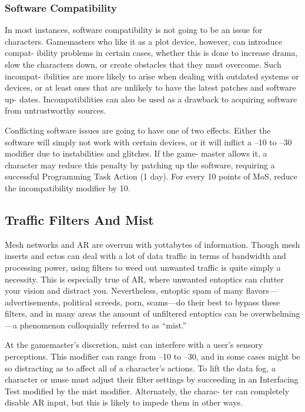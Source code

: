 \subsubsection{Software Compatibility}

In most instances, software compatibility is not going 
to be an issue for characters. Gamemasters who like 
it as a plot device, however, can introduce compat-
ibility problems in certain cases, whether this is done 
to increase drama, slow the characters down, or create 
obstacles that they must overcome. Such incompat-
ibilities are more likely to arise when dealing with 
outdated systems or devices, or at least ones that are 
unlikely to have the latest patches and software up-
dates. Incompatibilities can also be used as a drawback 
to acquiring software from untrustworthy sources.

Conflicting software issues are going to have one of 
two effects. Either the software will simply not work 
with certain devices, or it will inflict a –10 to –30 
modifier due to instabilities and glitches. If the game-
master allows it, a character may reduce this penalty 
by patching up the software, requiring a successful 
Programming Task Action (1 day). For every 10 points 
of MoS, reduce the incompatibility modifier by 10.

\subsection{Traffic Filters And Mist}

Mesh networks and AR are overrun with yottabytes of 
information. Though mesh inserts and ectos can deal 
with a lot of data traffic in terms of bandwidth and 
processing power, using filters to weed out unwanted 
traffic is quite simply a necessity. This is especially true 
of AR, where unwanted entoptics can clutter your 
vision and distract you. Nevertheless, entoptic spam of 
many flavors—advertisements, political screeds, porn, 
scams—do their best to bypass these filters, and in 
many areas the amount of unfiltered entoptics can be 
overwhelming—a phenomenon colloquially referred 
to as ``mist.''

At the gamemaster's discretion, mist can interfere 
with a user's sensory perceptions. This modifier can 
range from –10 to –30, and in some cases might be 
so distracting as to affect all of a character's actions. 
To lift the data fog, a character or muse must adjust 
their filter settings by succeeding in an Interfacing Test 
modified by the mist modifier. Alternately, the charac-
ter can completely disable AR input, but this is likely 
to impede them in other ways.


